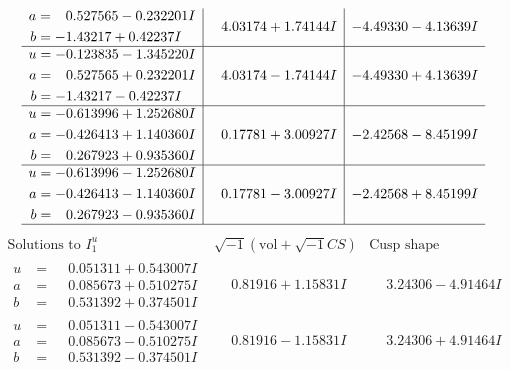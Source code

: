 \documentclass[1p]{elsarticle_modified}
\theoremstyle{definition}
\newcommand{\I}{\sqrt{-1}}
\begin{document}
$$\begin{array}{c|c|c}
\begin{aligned}
a &= \phantom{-}0.527565 - 0.232201 I \\
b &= -1.43217 + 0.42237 I\end{aligned}
 & \phantom{-}4.03174 + 1.74144 I & -4.49330 - 4.13639 I \\ \hline\begin{aligned}
u &= -0.123835 - 1.345220 I \\
a &= \phantom{-}0.527565 + 0.232201 I \\
b &= -1.43217 - 0.42237 I\end{aligned}
 & \phantom{-}4.03174 - 1.74144 I & -4.49330 + 4.13639 I \\ \hline\begin{aligned}
u &= -0.613996 + 1.252680 I \\
a &= -0.426413 + 1.140360 I \\
b &= \phantom{-}0.267923 + 0.935360 I\end{aligned}
 & \phantom{-}0.17781 + 3.00927 I & -2.42568 - 8.45199 I \\ \hline\begin{aligned}
u &= -0.613996 - 1.252680 I \\
a &= -0.426413 - 1.140360 I \\
b &= \phantom{-}0.267923 - 0.935360 I\end{aligned}
 & \phantom{-}0.17781 - 3.00927 I & -2.42568 + 8.45199 I\\
 \hline 
 \end{array}$$\newpage$$\begin{array}{c|c|c}  
\text{Solutions to }I^u_{1}& \I (\text{vol} + \sqrt{-1}CS) & \text{Cusp shape}\\
 \hline 
\begin{aligned}
u &= \phantom{-}0.051311 + 0.543007 I \\
a &= \phantom{-}0.085673 + 0.510275 I \\
b &= \phantom{-}0.531392 + 0.374501 I\end{aligned}
 & \phantom{-}0.81916 + 1.15831 I & \phantom{-}3.24306 - 4.91464 I \\ \hline\begin{aligned}
u &= \phantom{-}0.051311 - 0.543007 I \\
a &= \phantom{-}0.085673 - 0.510275 I \\
b &= \phantom{-}0.531392 - 0.374501 I\end{aligned}
 & \phantom{-}0.81916 - 1.15831 I & \phantom{-}3.24306 + 4.91464 I \\ \hline\begin{aligned}

\end{aligned}
\end{array}$$
\end{document}
